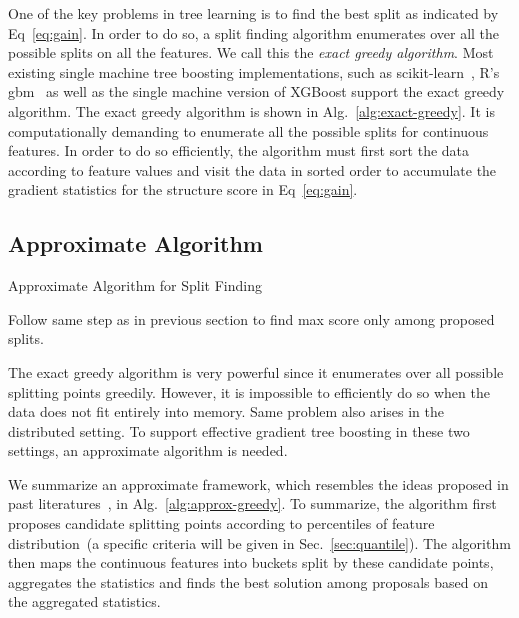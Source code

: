 \documentclass{sig-alternate-05-2015}
\begin{document}
One of the key problems in tree learning is to find the best split as indicated by Eq~\eqref{eq:gain}.
In order to do so, a split finding algorithm enumerates over all the possible splits on all the features. We call this the \emph{exact greedy algorithm}.
Most existing single machine tree boosting implementations, such as scikit-learn~\cite{scikit-learn}, R's gbm~\cite{RGBM} as well as the single machine version of XGBoost support the exact greedy algorithm.
The exact greedy algorithm is shown in Alg.~\ref{alg:exact-greedy}.
It is computationally demanding to enumerate all the possible splits for continuous features.
In order to do so efficiently, the algorithm must first  sort the data according to feature values and visit the data in sorted order to accumulate the gradient statistics
for the structure score in Eq~\eqref{eq:gain}.

\subsection{Approximate Algorithm}

\begin{algorithm}[t]
    \caption{Approximate Algorithm for Split Finding}\label{alg:approx-greedy}
     Follow same step as in previous section to find max score only among proposed splits.\\
\end{algorithm}

The exact greedy algorithm is very powerful since it enumerates over all possible splitting points greedily.
However, it is impossible to efficiently  do so when the data does not fit entirely into memory.
Same problem also arises in the distributed setting.
To support effective gradient tree boosting in these two settings, an approximate algorithm is needed.

We summarize an approximate framework, which resembles the ideas proposed in past literatures~\cite{McRank,Bekkerman:Scale,tyree2011parallel},
in Alg.~\ref{alg:approx-greedy}.
To summarize, the algorithm  first proposes candidate splitting points according to percentiles of feature distribution~(a specific criteria will be given in Sec.~\ref{sec:quantile}).
The algorithm then maps the continuous features into buckets split by these candidate points, aggregates the statistics and finds the best solution among proposals based on the aggregated statistics.
\end{document}
